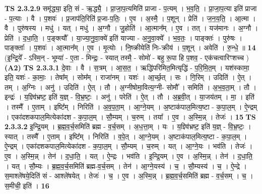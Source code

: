 \documentclass[17pt]{extarticle}
\begin{document}
                  \newline
                                \textbf{ TS 2.3.2.9} \newline
                  समृ॑द्ध्या॒ इति॒ सं - ऋ॒द्ध्यै॒ । प्रा॒जा॒प॒त्यमिति॑ प्राजा - प॒त्यम् । भ॒व॒ति॒ । प्रा॒जा॒प॒त्या इति॑ प्राजा - प॒त्याः । वै । प॒शवः॑ । प्र॒जाप॑ति॒रिति॑ प्र॒जा-प॒तिः॒ । ए॒व । अ॒स्मै॒ । प॒शून् । प्रेति॑ । ज॒न॒य॒ति॒ । आ॒त्मा । वै । पुरु॑षस्य । मधु॑ । यत् । मधु॑ । अ॒ग्नौ । जु॒होति॑ । आ॒त्मान᳚म् । ए॒व । तत् । यज॑मानः । अ॒ग्नौ । प्रेति॑ । द॒धा॒ति॒ । प॒ङ्क्त्यौ᳚ । या॒ज्या॒नु॒वा॒क्ये॑ इति॑ याज्या - अ॒नु॒वा॒क्ये᳚ । भ॒व॒तः॒ । पाङ्क्तः॑ । पुरु॑षः । पाङ्क्ताः᳚ । प॒शवः॑ । आ॒त्मान᳚म् । ए॒व । मृ॒त्योः । नि॒ष्क्रीयेति॑ निः-क्रीय॑ । प॒शून् । अवेति॑ । रु॒न्धे॒ ॥ \textbf{  14} \newline
                  \newline
                      (इ॒न्द्रि॒ये᳚ - ऽस्मि॒न् - भूम्या॑ - ए॒ता - मिन्द्रः॒ - स्यात् तस्मै॒ - सोमो॑ - बहु रू॒पा हि प॒शव॒ - एक॑चत्वारिꣳशच्च )  \textbf{(A2)} \newline \newline
                                \textbf{ TS 2.3.3.1} \newline
                  दे॒वाः । वै । स॒त्रम् । आ॒स॒त॒ । ऋद्धि॑परिमित॒मित्यृद्धि॑ - प॒रि॒मि॒त॒म् । यश॑स्कामा॒ इति॒ यशः॑ - का॒माः॒ । तेषा᳚म् । सोम᳚म् । राजा॑नम् । यशः॑ । आ॒र्च्छ॒त् । सः । गि॒रिम् । उदिति॑ । ऐ॒त् । तम् । अ॒ग्निः । अनु॑ । उदिति॑ । ऐ॒त् । तौ । अ॒ग्नीषोमा॒वित्य॒ग्नी- सोमौ᳚ । समिति॑ । अ॒भ॒व॒ता॒म् । तौ । इन्द्रः॑ । य॒ज्ञ्वि॑भ्रष्ट॒ इति॑ य॒ज्ञ् - वि॒भ्र॒ष्टः॒ । अनु॑ । परेति॑ । ऐ॒त् । तौ । अ॒ब्र॒वी॒त् । या॒जय॑तम् । मा॒ । इति॑ । तस्मै᳚ । ए॒ताम् । इष्टि᳚म् । निरिति॑ । अ॒व॒प॒ता॒म् । आ॒ग्ने॒यम् । अ॒ष्टाक॑पाल॒मित्य॒ष्टा - क॒पा॒ल॒म् । ऐ॒न्द्रम् । एका॑दशकपाल॒मित्येका॑दश - क॒पा॒ल॒म् । सौ॒म्यम् । च॒रुम् । तया᳚ । ए॒व । अ॒स्मि॒न्न् । तेजः॑ । \textbf{  15} \newline
                  \newline
                                \textbf{ TS 2.3.3.2} \newline
                  इ॒न्द्रि॒यम् । ब्र॒ह्म॒व॒र्च॒समिति॑ ब्रह्म - व॒र्च॒सम् । अ॒ध॒त्ता॒म् । यः । य॒ज्ञ्वि॑भ्रष्ट॒ इति॑ य॒ज्ञ् - वि॒भ्र॒ष्टः॒ । स्यात् । तस्मै᳚ । ए॒ताम् । इष्टि᳚म् । निरिति॑ । व॒पे॒त् । आ॒ग्ने॒यम् । अ॒ष्टाक॑पाल॒मित्य॒ष्टा - क॒पा॒ल॒म् । ऐ॒न्द्रम् । एका॑दशकपाल॒मित्येका॑दश - क॒पा॒ल॒म् । सौ॒म्यम् । च॒रुम् । यत् । आ॒ग्ने॒यः । भव॑ति । तेजः॑ । ए॒व । अ॒स्मि॒न्न् । तेन॑ । द॒धा॒ति॒ । यत् । ऐ॒न्द्रः । भव॑ति । इ॒न्द्रि॒यम् । ए॒व । अ॒स्मि॒न्न् । तेन॑ । द॒धा॒ति॒ । यत् । सौ॒म्यः । ब्र॒ह्म॒व॒र्च॒समिति॑ ब्रह्म-व॒र्च॒सम् । तेन॑ । आ॒ग्ने॒यस्य॑ । च॒ । सौ॒म्यस्य॑ । च॒ । ऐ॒न्द्रे । स॒माश्ले॑षये॒दिति॑ सं - आश्ले॑षयेत् । तेजः॑ । च॒ । ए॒व । अ॒स्मि॒न्न् । ब्र॒ह्म॒व॒र्च॒समिति॑ ब्रह्म - व॒र्च॒सम् । च॒ । स॒मीची॒ इति॑ । \textbf{  16} \newline
\end{document}
